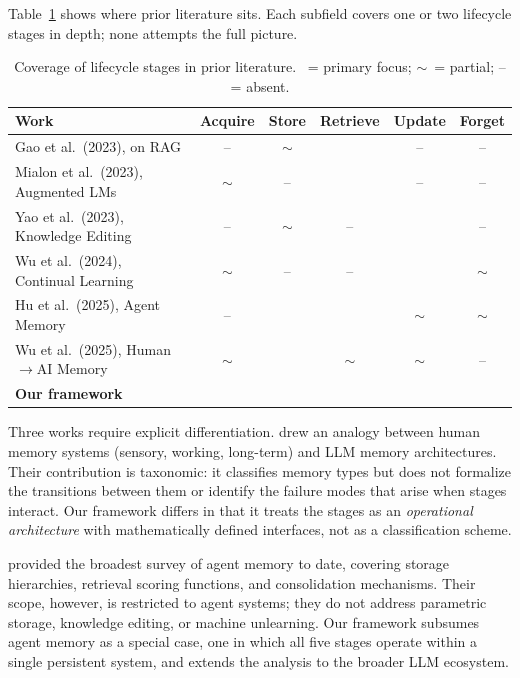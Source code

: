 \documentclass[10pt]{article}
\newcommand{\fullmark}{\checkmark}
\newcommand{\halfmark}{$\sim$}
\begin{document}
Table~\ref{tab:survey_comparison} shows where prior literature sits. Each subfield covers one or two lifecycle stages in depth; none attempts the full picture.

\begin{table}[t]
\centering
\caption{Coverage of lifecycle stages in prior literature. \fullmark\ = primary focus; \halfmark\ = partial; -- = absent.}
\label{tab:survey_comparison}
\small
\begin{tabular}{@{}lccccc@{}}
\toprule
\textbf{Work} & \textbf{Acquire} & \textbf{Store} & \textbf{Retrieve} & \textbf{Update} & \textbf{Forget} \\
\midrule
Gao et al.\ (2023), on RAG & -- & \halfmark & \fullmark & -- & -- \\
Mialon et al.\ (2023), Augmented LMs & \halfmark & -- & \fullmark & -- & -- \\
Yao et al.\ (2023), Knowledge Editing & -- & \halfmark & -- & \fullmark & -- \\
Wu et al.\ (2024), Continual Learning & \halfmark & -- & -- & \fullmark & \halfmark \\
Hu et al.\ (2025), Agent Memory & -- & \fullmark & \fullmark & \halfmark & \halfmark \\
Wu et al.\ (2025), Human$\to$AI Memory & \halfmark & \fullmark & \halfmark & \halfmark & -- \\
\midrule
\textbf{Our framework} & \fullmark & \fullmark & \fullmark & \fullmark & \fullmark \\
\bottomrule
\end{tabular}
\vspace{-1em}
\end{table}

Three works require explicit differentiation. \citet{wu2025humanmemory} drew an analogy between human memory systems (sensory, working, long-term) and LLM memory architectures. Their contribution is taxonomic: it classifies memory types but does not formalize the transitions between them or identify the failure modes that arise when stages interact. Our framework differs in that it treats the stages as an \textit{operational architecture} with mathematically defined interfaces, not as a classification scheme.

\citet{hu2025agentmemory} provided the broadest survey of agent memory to date, covering storage hierarchies, retrieval scoring functions, and consolidation mechanisms. Their scope, however, is restricted to agent systems; they do not address parametric storage, knowledge editing, or machine unlearning. Our framework subsumes agent memory as a special case, one in which all five stages operate within a single persistent system, and extends the analysis to the broader LLM ecosystem.
\end{document}
